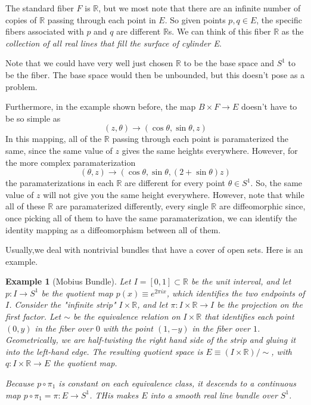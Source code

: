 \documentclass{article}
\newtheorem{example}{Example}[section]
\theoremstyle{remark}
\theoremstyle{definition}
\begin{document}
  The standard fiber $F$ is $\mathbb{R}$, but we most note that there are an infinite number of copies of $\mathbb{R}$ passing through each point in $E$. So given points $p, q \in E$, the specific fibers associated with $p$ and $q$ are different $\mathbb{R}$s. We can think of this fiber $\mathbb{R}$ as the \textit{collection of all real lines that fill the surface of cylinder E}. 

  Note that we could have very well just chosen $\mathbb{R}$ to be the base space and $S^1$ to be the fiber. The base space would then be unbounded, but this doesn't pose as a problem. 

  Furthermore, in the example shown before, the map $B \times F \longrightarrow E$ doesn't have to be so simple as 
  \[ (z, \theta) \longrightarrow (\cos{\theta}, \sin{\theta}, z) \]
  In this mapping, all of the $\mathbb{R}$ passing through each point is paramaterized the same, since the same value of $z$ gives the same heights everywhere. However, for the more complex paramaterization
  \[ (\theta, z) \longrightarrow (\cos{\theta}, \sin{\theta}, (2 + \sin{\theta}) z) \]
  the paramaterizations in each $\mathbb{R}$ are different for every point $\theta \in S^1$. So, the same value of $z$ will not give you the same height everywhere. However, note that while all of these $\mathbb{R}$ are paramaterized differently, every single $\mathbb{R}$ are diffeomorphic since, once picking all of them to have the same paramaterization, we can identify the identity mapping as a diffeomorphism between all of them. 

  Usually,we deal with nontrivial bundles that have a cover of open sets. Here is an example. 

  \begin{example}[Mobius Bundle]
  Let $I = [0,1] \subset \mathbb{R}$ be the unit interval, and let $p: I \longrightarrow S^1$ be the quotient map $p(x) \equiv e^{2 \pi i x}$, which identifies the two endpoints of $I$. Consider the "infinite strip" $I \times \mathbb{R}$, and let $\pi: I \times \mathbb{R} \longrightarrow I$ be the projection on the first factor. Let $\sim$ be the equivalence relation on $I \times \mathbb{R}$ that identifies each point $(0,y)$ in the fiber over $0$ with the point $(1, -y)$ in the fiber over $1$. Geometrically, we are half-twisting the right hand side of the strip and gluing it into the left-hand edge. The resulting quotient space is $E \equiv (I \times \mathbb{R})/ \sim$, with $q: I \times \mathbb{R} \longrightarrow E$ the quotient map. 

  Because $p \circ \pi_1$ is constant on each equivalence class, it descends to a continuous map $p \circ \pi_1 = \pi: E \longrightarrow S^1$. THis makes $E$ into a smooth real line bundle over $S^1$. 
  \end{example}
\end{document}
